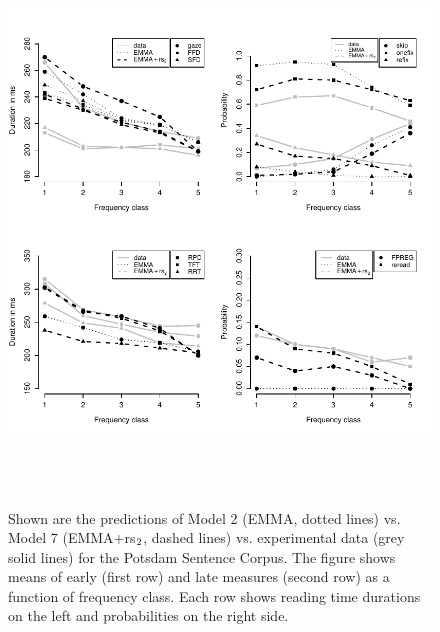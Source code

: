 \begin{figure}[!htbp]
\begin{center}
\includegraphics[width=\textwidth,height=15cm]{figures/fig-psc-fstat}
\end{center}
\caption{Shown are the predictions of Model 2 (EMMA, dotted lines) vs. Model 7 (EMMA+rs$\protect  _2$, dashed lines) vs. experimental data (grey solid lines) for the Potsdam Sentence Corpus. The figure shows means of early (first row) and late measures (second row) as a function of frequency class. Each row shows reading time durations on the left and probabilities on the right side.}
\label{fig:psc}
\end{figure}


